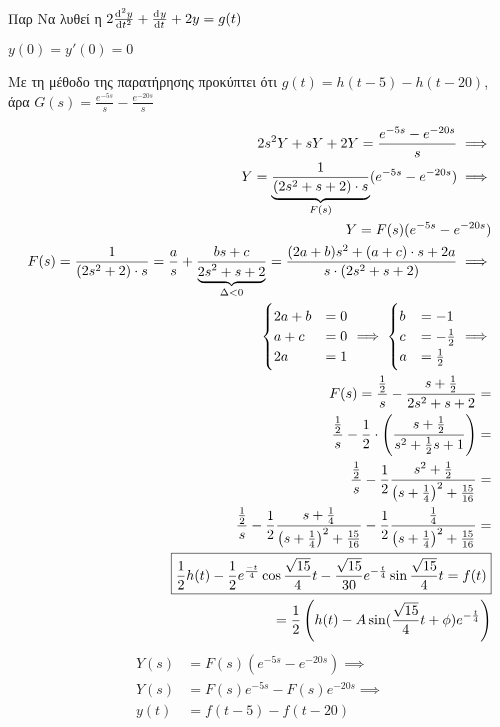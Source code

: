 \documentclass[11pt,a4paper,titlepage,draft]{article}
\begin{document}
\begin{exercise*}{Παρ}
Να λυθεί η \(
2\od[2]{y}{t}+\od{y}{t}+2y = g(t)
\)

\(
y(0)=y'(0)=0
\)

\tcblower
Με τη μέθοδο της παρατήρησης προκύπτει ότι \( g(t) = h(t-5)-h(t-20) \), άρα \( G(s)= \frac{e^{-5s}}{s} - \frac{e^{-20s}}{s} \)

\begin{align*}
2s^2Y+sY+2Y = \frac{e^{-5s}-e^{-20s}}{s} \implies \\
Y = \underbrace{\frac{1}{(2s^2+s+2)\cdot s}}_{\mathclap{F(s)}}(e^{-5s}-e^{-20s}) \implies \\
Y = F(s) (e^{-5s}-e^{-20s}) \\
F(s) = \frac{1}{(2s^2+2)\cdot s} = \frac{a}{s}+\frac{bs+c}{\underbrace{2s^2+s+2}_{\mathclap{\Delta < 0}}} = \frac{(2a+b)s^2+(a+c)\cdot s+2a}{s \cdot (2s^2+s+2)} \implies \\
\begin{cases}
2a+b &= 0
\\ a+c &= 0
\\ 2a &= 1
\end{cases} \implies \begin{cases}
b &= -1 \\
c &= -\frac{1}{2} \\
a &= \frac{1}{2}
\end{cases} \implies \\
F(s) = \frac{\frac{1}{2}}{s} - \frac{s+\frac{1}{2}}{2s^2+s+2} = \\
\frac{\frac{1}{2}}{s}-\frac{1}{2}\cdot \left(
\frac{s+\frac{1}{2}}{s^2+\frac{1}{2}s+1}
\right) = \\
\frac{\frac{1}{2}}{s}-\frac{1}{2}\frac{s^2+\frac{1}{2}}{\left(s+\frac{1}{4} \right)^2+\frac{15}{16}} = \\
\frac{\frac{1}{2}}{s}-\frac{1}{2}\frac{s+\frac{1}{4}}{\left(s+\frac{1}{4} \right)^2+\frac{15}{16}} - \frac{1}{2}\frac{\frac{1}{4}}{\left(s+\frac{1}{4} \right)^2+\frac{15}{16}} = \\
\boxed{
	\frac{1}{2}h(t) - \frac{1}{2}e^\frac{-t}{4}\cos\frac{\sqrt{15}}{4}t - \frac{\sqrt{15}}{30}e^{-\frac{t}{4}}\sin\frac{\sqrt{15}}{4}t=f(t)
	} \\
	= \frac{1}{2} \left(
	h(t) - A\sin(\frac{\sqrt{15}}{4}t+\phi)e^{-\frac{t}{4}}
	\right)
\end{align*}
\begin{align*}
Y(s) &= F(s)(e^{-5s}-e^{-20s}) \implies \\
Y(s) &= F(s)e^{-5s}-F(s)e^{-20s} \implies \\
y(t) &= f(t-5) - f(t-20)
\end{align*}
\end{exercise*}
\end{document}

